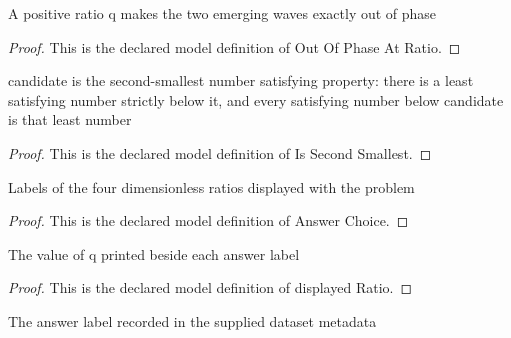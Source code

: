 \begin{definition}
  \label{def:physics:phyx-mini-0311:phyxminiproblems-problemphyxmini0311-outofphaseatratio}
  A positive ratio q makes the two emerging waves exactly out of phase
\end{definition}
\begin{proof}
  This is the declared model definition of Out Of Phase At Ratio.
\end{proof}
\begin{definition}
  \label{def:physics:phyx-mini-0311:phyxminiproblems-problemphyxmini0311-issecondsmallest}
  candidate is the second-smallest number satisfying property: there is a least satisfying number strictly below it, and every satisfying number below candidate is that least number
\end{definition}
\begin{proof}
  This is the declared model definition of Is Second Smallest.
\end{proof}
\begin{definition}
  \label{def:physics:phyx-mini-0311:phyxminiproblems-problemphyxmini0311-answerchoice}
  Labels of the four dimensionless ratios displayed with the problem
\end{definition}
\begin{proof}
  This is the declared model definition of Answer Choice.
\end{proof}
\begin{definition}
  \label{def:physics:phyx-mini-0311:phyxminiproblems-problemphyxmini0311-displayedratio}
  The value of q printed beside each answer label
\end{definition}
\begin{proof}
  This is the declared model definition of displayed Ratio.
\end{proof}
\begin{definition}
  \label{def:physics:phyx-mini-0311:phyxminiproblems-problemphyxmini0311-recordedanswerchoice}
  The answer label recorded in the supplied dataset metadata
\end{definition}
